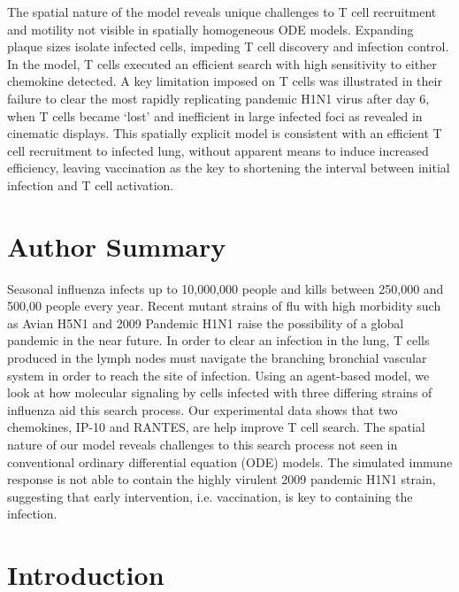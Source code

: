 \documentclass[10pt]{article}
\begin{document}
The spatial nature of the model reveals unique challenges to T cell recruitment and motility not visible in spatially homogeneous ODE models.  Expanding plaque sizes isolate infected cells, impeding T cell discovery and infection control. In the model, T cells executed an efficient search with high sensitivity to either chemokine detected. A key limitation imposed on T cells was illustrated in their failure to clear the most rapidly replicating pandemic H1N1 virus after day 6, when T cells became ‘lost’ and inefficient in large infected foci as revealed in cinematic displays. This spatially explicit model is consistent with an efficient T cell recruitment to infected lung, without apparent means to induce increased efficiency, leaving vaccination as the key to shortening the interval between initial infection and T cell activation.

\section*{Author Summary}

Seasonal influenza infects up to 10,000,000 people and kills between 250,000 and 500,00 people every year.  Recent mutant strains of flu with high morbidity such as Avian H5N1 and 2009 Pandemic H1N1 raise the possibility of a global pandemic in the near future.  In order to clear an infection in the lung, T cells produced in the lymph nodes must navigate the branching bronchial vascular system in order to reach the site of infection.  Using an agent-based model, we look at how molecular signaling by cells infected with three differing strains of influenza aid this search process.  Our experimental data shows that two chemokines, IP-10 and RANTES, are help improve T cell search.  The spatial nature of our model reveals challenges to this search process not seen in conventional ordinary differential equation (ODE) models.  The simulated immune response is not able to contain the highly virulent 2009 pandemic H1N1 strain, suggesting that early intervention, i.e. vaccination, is key to containing the infection.

\section*{Introduction}
\end{document}
